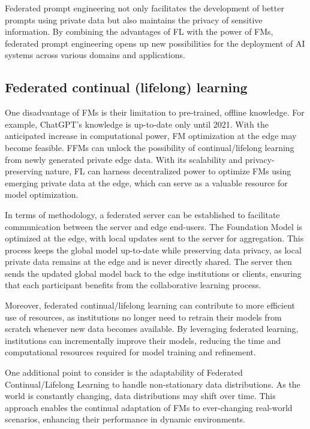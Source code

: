 Federated prompt engineering not only facilitates the development of better prompts using private data but also maintains the privacy of sensitive information. By combining the advantages of FL with the power of FMs, federated prompt engineering opens up new possibilities for the deployment of AI systems across various domains and applications.









\subsection{Federated continual (lifelong) learning}
One disadvantage of FMs is their limitation to pre-trained, offline knowledge. For example, ChatGPT's knowledge is up-to-date only until 2021. With the anticipated increase in computational power, FM optimization at the edge may become feasible. FFMs can unlock the possibility of continual/lifelong learning from newly generated private edge data. With its scalability and privacy-preserving nature, FL can harness decentralized power to optimize FMs using emerging private data at the edge, which can serve as a valuable resource for model optimization.

In terms of methodology, a federated server can be established to facilitate communication between the server and edge end-users. The Foundation Model is optimized at the edge, with local updates sent to the server for aggregation. This process keeps the global model up-to-date while preserving data privacy, as local private data remains at the edge and is never directly shared. The server then sends the updated global model back to the edge institutions or clients, ensuring that each participant benefits from the collaborative learning process.

Moreover, federated continual/lifelong learning can contribute to more efficient use of resources, as institutions no longer need to retrain their models from scratch whenever new data becomes available. By leveraging federated learning, institutions can incrementally improve their models, reducing the time and computational resources required for model training and refinement.

One additional point to consider is the adaptability of Federated Continual/Lifelong Learning to handle non-stationary data distributions. As the world is constantly changing, data distributions may shift over time. This approach enables the continual adaptation of FMs to ever-changing real-world scenarios, enhancing their performance in dynamic environments.






